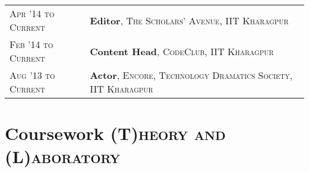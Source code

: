 \documentclass[a4paper,10pt]{extarticle} %
\begin{document}
\begin{tabular}{R{3.0cm}|p{15.0cm}}
\textsc{Apr '14 to Current} & \textbf{Editor}, \textsc{The Scholars' Avenue, IIT Kharagpur}\\
\textsc{Feb '14 to Current} & \textbf{Content Head}, \textsc{CodeClub, IIT Kharagpur} \\
\textsc{Aug '13 to Current} & \textbf{Actor}, \textsc{Encore, Technology Dramatics Society, IIT Kharagpur} \\
\end{tabular}



\section{Coursework
\hfill\small\textsc{(T)heory and (L)aboratory}}
\end{document}
